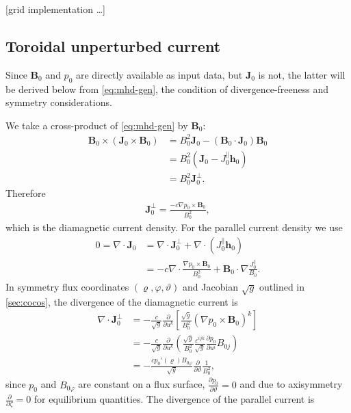 \documentclass[a4paper, twoside, 10pt, english]{article}
\numberwithin{equation}{section}
\let\temp\varrho
\let\varrho\rho
\let\rho\temp
\let\temp\vartheta
\let\vartheta\theta
\let\theta\temp
\let\temp\varphi
\let\varphi\phi
\let\phi\temp
\let\vec\symbf
\newcommand*\grad{\ensuremath{\nabla}}
\newcommand*\divg{\ensuremath{\nabla \cdot}}
\newcommand*\pd[2][]{\ensuremath{\frac{\partial #1}{\partial #2}}}  %
\begin{document}
[grid implementation \ldots]

\subsection{Toroidal unperturbed current}
\label{sec:j0phi}

Since $\vec{B}_{0}$ and $p_{0}$ are directly available as input data, but $\vec{J}_{0}$ is not, the latter will be derived below from \cref{eq:mhd-gen}, the condition of divergence-freeness and symmetry considerations.

We take a cross-product of \cref{eq:mhd-gen} by $\vec{B}_{0}$:
\begin{align}
  \vec{B}_{0} \times \left( \vec{J}_{0} \times \vec{B}_{0} \right) &= B_{0}^{2} \vec{J}_{0} - (\vec{B}_{0} \cdot \vec{J}_{0}) \vec{B}_{0} \nonumber \\
  &= B_{0}^{2} (\vec{J}_{0} - J_{0}^{\parallel} \vec{h}_{0}) \nonumber \\
  &= B_{0}^{2} \vec{J}_{0}^{\perp}.
\end{align}
Therefore
\begin{gather}
  \vec{J}_{0}^{\perp} = \frac{-c \grad p_{0} \times \vec{B}_{0}}{B_{0}^{2}},
\end{gather}
which is the diamagnetic current density. For the parallel current density we use
\begin{align}
 0 = \divg \vec{J}_{0} &= \divg \vec{J}_{0}^{\perp} + \divg (J_{0}^{\parallel} \vec{h}_{0}) \nonumber \\
 &= -c \divg \frac{\grad p_{0} \times \vec{B}_{0}}{B_{0}^{2}} + \vec{B}_{0} \cdot \grad \frac{J_{0}^{\parallel}}{B_{0}}.
\end{align}
In symmetry flux coordinates $(\rho, \phi, \theta)$ and Jacobian $\sqrt{g}$ outlined in \cref{sec:cocos}, the divergence of the diamagnetic current is
\begin{align}
  \divg \vec{J}_{0}^{\perp} &= -\frac{c}{\sqrt{g}} \pd{u^{k}} \left[ \frac{\sqrt{g}}{B_{0}^{2}} \left( \grad p_{0} \times \vec{B}_{0} \right)^{k} \right] \nonumber \\
  &= -\frac{c}{\sqrt{g}} \pd{u^{k}} \left( \frac{\sqrt{g}}{B_{0}^{2}} \frac{\varepsilon^{ijk}}{\sqrt{g}} \pd[p_{0}]{u^{i}} B_{0 j} \right) \nonumber \\
  &= -\frac{c p_{0}' (\rho) B_{0 \phi}}{\sqrt{g}} \pd{\theta} \frac{1}{B_{0}^{2}},
\end{align}
since $p_{0}$ and $B_{0 \phi}$ are constant on a flux surface, $\pd[p_{0}]{\theta} = 0$ and due to axisymmetry $\pd{\zeta} = 0$ for equilibrium quantities. The divergence of the parallel current is
\end{document}
